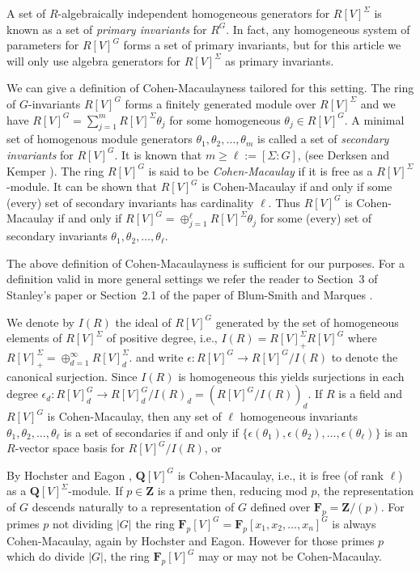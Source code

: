 \documentclass[12pt]{amsart}
\renewcommand{\geq}{\geqslant}
\newcommand{\QQ}{\mathbf{Q}} %
\newcommand{\ZZ}{\mathbf{Z}} %
\newcommand{\FF}{\mathbf{F}} %
\newcommand{\QQ}{\mathbb{Q}} %
\newcommand{\ZZ}{\mathbb{Z}} %
\newcommand{\FF}{\mathbb{F}} %
\theoremstyle{definition}
\begin{document}
A set of $R$-algebraically independent homogeneous generators for $R[V]^{\Sigma}$ is known as a set of \emph{primary invariants} for $R^G$.
In fact, any homogeneous system of parameters for $R[V]^G$ forms a set of primary invariants, but for this article we will only use algebra generators for $R[V]^{\Sigma}$ as primary invariants.

We can give a definition of Cohen-Macaulayness tailored for this setting. The ring of $G$-invariants $R[V]^G$ forms a finitely generated module over $R[V]^{\Sigma}$ and we have $R[V]^G = \sum_{j=1}^m R[V]^{\Sigma}\theta_j$  for some homogeneous $\theta_j \in R[V]^G$.  
A minimal set of homogenous module generators $\theta_1,\theta_2,\dots,\theta_m$ is called a set of {\em secondary invariants} for $R[V]^G$.  
It is known that $m \geq \ell :=[\Sigma:G]$, (see Derksen and Kemper \cite[Thm 3.9.1, pg 111]{D-K}).
The ring $R[V]^G$ is said to be \emph{Cohen-Macaulay} if it is free as a $R[V]^{\Sigma}$-module.
It can be shown that $R[V]^G$ is Cohen-Macaulay if and only if 
some (every) set of secondary invariants has cardinality $\ell$.
Thus $R[V]^G$ is Cohen-Macaulay if and only if 
$R[V]^G = \oplus_{j=1}^\ell R[V]^{\Sigma}\theta_j$ for some (every)
set of secondary invariants $\theta_1,\theta_2,\dots,\theta_\ell$.  

The above definition of Cohen-Macaulayness is sufficient for our purposes.  For a definition valid in more general settings we refer the reader
to Section~3 of Stanley's paper \cite{bible} or Section~2.1 of the paper of Blum-Smith and Marques \cite{BenandSophie}. 

We denote by $I(R)$ the ideal of $R[V]^G$ generated by the set of homogeneous elements of $R[V]^\Sigma$ of positive degree, i.e.,
 $I(R)=R[V]_+^\Sigma R[V]^G$ where $R[V]^\Sigma_+ = \oplus_{d=1}^\infty R[V]^\Sigma_d$.
 and write $\epsilon: R[V]^G \longrightarrow R[V]^G/I(R)$ to denote the canonical surjection. 
 Since $I(R)$ is homogeneous this yields surjections in each degree
$\epsilon_d: R[V]_d^G \longrightarrow R[V]_d^G/I(R)_d = (R[V]^G/I(R))_d$.
If $R$ is a field and $R[V]^G$ is Cohen-Macaulay, then any set of $\ell$ homogeneous invariants $\theta_1,\theta_2,\dots,\theta_\ell$
is a set of secondaries if and only if
$\{\epsilon(\theta_1),\epsilon(\theta_2),\dots,
\epsilon(\theta_\ell)\}$ is an $R$-vector space basis
for $R[V]^G/I(R)$, \cite[prop. 3.1]{bible} or \cite[lemma 3.7.1]{D-K}

By Hochster and Eagon \cite[Proposition 19]{H-E},
$\QQ[V]^G$ is Cohen-Macaulay, i.e.,  it is free (of rank $\ell$) as a $\QQ[V]^{\Sigma}$-module.
If $p \in \ZZ$ is a prime then, reducing mod $p$, the representation of $G$ descends naturally to a representation of $G$
defined over $\FF_p=\ZZ/(p)$.  For primes $p$ not dividing $|G|$ the ring $\FF_p[V]^G=\FF_p[x_1,x_2,\dots,x_n]^G$ is always Cohen-Macaulay, again by Hochster and Eagon\cite[Proposition 19]{H-E}.
However for those primes $p$ which do divide $|G|$, the ring $\FF_p[V]^G$ may or may not be Cohen-Macaulay.
\end{document}
